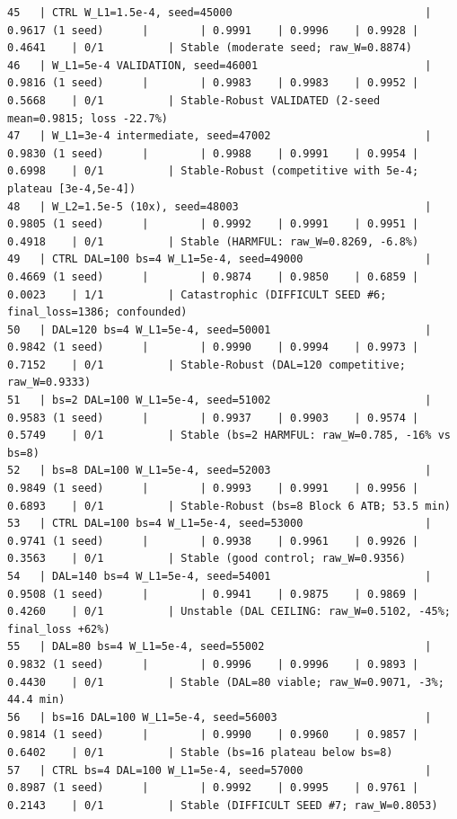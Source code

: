 \begin{tiny}
\begin{verbatim}
45   | CTRL W_L1=1.5e-4, seed=45000                              | 0.9617 (1 seed)      |        | 0.9991    | 0.9996    | 0.9928 | 0.4641    | 0/1          | Stable (moderate seed; raw_W=0.8874)
46   | W_L1=5e-4 VALIDATION, seed=46001                          | 0.9816 (1 seed)      |        | 0.9983    | 0.9983    | 0.9952 | 0.5668    | 0/1          | Stable-Robust VALIDATED (2-seed mean=0.9815; loss -22.7%)
47   | W_L1=3e-4 intermediate, seed=47002                        | 0.9830 (1 seed)      |        | 0.9988    | 0.9991    | 0.9954 | 0.6998    | 0/1          | Stable-Robust (competitive with 5e-4; plateau [3e-4,5e-4])
48   | W_L2=1.5e-5 (10x), seed=48003                             | 0.9805 (1 seed)      |        | 0.9992    | 0.9991    | 0.9951 | 0.4918    | 0/1          | Stable (HARMFUL: raw_W=0.8269, -6.8%)
49   | CTRL DAL=100 bs=4 W_L1=5e-4, seed=49000                   | 0.4669 (1 seed)      |        | 0.9874    | 0.9850    | 0.6859 | 0.0023    | 1/1          | Catastrophic (DIFFICULT SEED #6; final_loss=1386; confounded)
50   | DAL=120 bs=4 W_L1=5e-4, seed=50001                        | 0.9842 (1 seed)      |        | 0.9990    | 0.9994    | 0.9973 | 0.7152    | 0/1          | Stable-Robust (DAL=120 competitive; raw_W=0.9333)
51   | bs=2 DAL=100 W_L1=5e-4, seed=51002                        | 0.9583 (1 seed)      |        | 0.9937    | 0.9903    | 0.9574 | 0.5749    | 0/1          | Stable (bs=2 HARMFUL: raw_W=0.785, -16% vs bs=8)
52   | bs=8 DAL=100 W_L1=5e-4, seed=52003                        | 0.9849 (1 seed)      |        | 0.9993    | 0.9991    | 0.9956 | 0.6893    | 0/1          | Stable-Robust (bs=8 Block 6 ATB; 53.5 min)
53   | CTRL DAL=100 bs=4 W_L1=5e-4, seed=53000                   | 0.9741 (1 seed)      |        | 0.9938    | 0.9961    | 0.9926 | 0.3563    | 0/1          | Stable (good control; raw_W=0.9356)
54   | DAL=140 bs=4 W_L1=5e-4, seed=54001                        | 0.9508 (1 seed)      |        | 0.9941    | 0.9875    | 0.9869 | 0.4260    | 0/1          | Unstable (DAL CEILING: raw_W=0.5102, -45%; final_loss +62%)
55   | DAL=80 bs=4 W_L1=5e-4, seed=55002                         | 0.9832 (1 seed)      |        | 0.9996    | 0.9996    | 0.9893 | 0.4430    | 0/1          | Stable (DAL=80 viable; raw_W=0.9071, -3%; 44.4 min)
56   | bs=16 DAL=100 W_L1=5e-4, seed=56003                       | 0.9814 (1 seed)      |        | 0.9990    | 0.9960    | 0.9857 | 0.6402    | 0/1          | Stable (bs=16 plateau below bs=8)
57   | CTRL bs=4 DAL=100 W_L1=5e-4, seed=57000                   | 0.8987 (1 seed)      |        | 0.9992    | 0.9995    | 0.9761 | 0.2143    | 0/1          | Stable (DIFFICULT SEED #7; raw_W=0.8053)

\end{verbatim}
\end{tiny}
